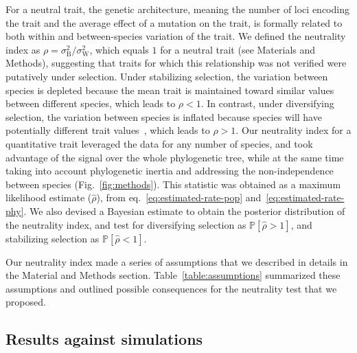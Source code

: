 \documentclass{article}
\newcommand{\proba}{\mathbb{P}}
\newcommand{\RateBetween}{\sigma^2_{\mathrm{B}}}
\newcommand{\RateWhithin}{\sigma^2_{\mathrm{W}}}
\newcommand{\NI}{\rho}
\newcommand{\EstNI}{\widehat{\rho}}
\begin{document}
For a neutral trait, the genetic architecture, meaning the number of loci encoding the trait and the average effect of a mutation on the trait, is formally related to both within and between-species variation of the trait.
We defined the neutrality index as $\NI = \RateBetween/\RateWhithin$, which equals $1$ for a neutral trait (see Materials and Methods), suggesting that traits for which this relationship was not verified were putatively under selection.
Under stabilizing selection, the variation between species is depleted because the mean trait is maintained toward similar values between different species, which leads to $\NI < 1$.
In contrast, under diversifying selection, the variation between species is inflated because species will have potentially different trait values~\citep{hansen_stabilizing_1997}, which leads to $\NI > 1$.
Our neutrality index for a quantitative trait leveraged the data for any number of species, and took advantage of the signal over the whole phylogenetic tree, while at the same time taking into account phylogenetic inertia and addressing the non-independence between species (Fig.~\ref{fig:methods}).
This statistic was obtained as a maximum likelihood estimate ($\EstNI$), from eq.~\ref{eq:estimated-rate-pop} and~\ref{eq:estimated-rate-phy}.
We also devised a Bayesian estimate to obtain the posterior distribution of the neutrality index, and test for diversifying selection as $\proba [\EstNI > 1]$, and stabilizing selection as $\proba [\EstNI < 1]$.

Our neutrality index made a series of assumptions that we described in details in the Material and Methods section.
Table~\ref{table:assumptions} summarized these assumptions and outlined possible consequences for the neutrality test that we proposed.

\subsection*{Results against simulations}\label{subsec:results-against-simulations}
\end{document}
